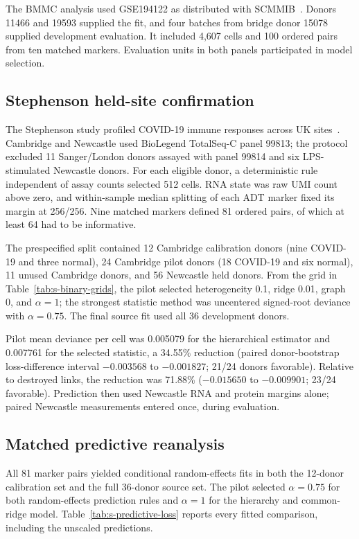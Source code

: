 \documentclass[10pt,a4paper]{article}
\begin{document}
The BMMC analysis used GSE194122 as distributed with SCMMIB~\cite{luecken2021sandbox}. Donors 11466 and 19593 supplied the fit, and four batches from bridge donor 15078 supplied development evaluation. It included 4,607 cells and 100 ordered pairs from ten matched markers. Evaluation units in both panels participated in model selection.

\subsection{Stephenson held-site confirmation}

The Stephenson study profiled COVID-19 immune responses across UK sites~\cite{stephenson2021}. Cambridge and Newcastle used BioLegend TotalSeq-C panel 99813; the protocol excluded 11 Sanger/London donors assayed with panel 99814 and six LPS-stimulated Newcastle donors. For each eligible donor, a deterministic rule independent of assay counts selected 512 cells. RNA state was raw UMI count above zero, and within-sample median splitting of each ADT marker fixed its margin at 256/256. Nine matched markers defined 81 ordered pairs, of which at least 64 had to be informative.

The prespecified split contained 12 Cambridge calibration donors (nine COVID-19 and three normal), 24 Cambridge pilot donors (18 COVID-19 and six normal), 11 unused Cambridge donors, and 56 Newcastle held donors. From the grid in Table~\ref{tab:s-binary-grids}, the pilot selected heterogeneity 0.1, ridge 0.01, graph 0, and $\alpha=1$; the strongest statistic method was uncentered signed-root deviance with $\alpha=0.75$. The final source fit used all 36 development donors.

Pilot mean deviance per cell was 0.005079 for the hierarchical estimator and 0.007761 for the selected statistic, a 34.55\% reduction (paired donor-bootstrap loss-difference interval $-0.003568$ to $-0.001827$; 21/24 donors favorable). Relative to destroyed links, the reduction was 71.88\% ($-0.015650$ to $-0.009901$; 23/24 favorable). Prediction then used Newcastle RNA and protein margins alone; paired Newcastle measurements entered once, during evaluation.

\subsection{Matched predictive reanalysis}

All 81 marker pairs yielded conditional random-effects fits in both the
12-donor calibration set and the full 36-donor source set. The pilot
selected $\alpha=0.75$ for both random-effects prediction rules and
$\alpha=1$ for the hierarchy and common-ridge model. Table~\ref{tab:s-predictive-loss}
reports every fitted comparison, including the unscaled predictions.
\end{document}
